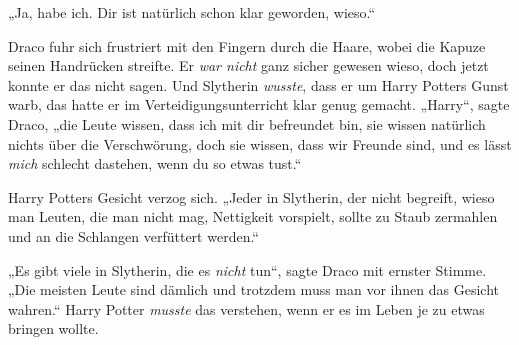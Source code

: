 „Ja, habe ich. Dir ist natürlich schon klar geworden, wieso.“

Draco fuhr sich frustriert mit den Fingern durch die Haare, wobei die Kapuze seinen Handrücken streifte. Er \emph{war nicht} ganz sicher gewesen wieso, doch jetzt konnte er das nicht sagen. Und Slytherin \emph{wusste}, dass er um Harry Potters Gunst warb, das hatte er im Verteidigungsunterricht klar genug gemacht.
„Harry“, sagte Draco, „die Leute wissen, dass ich mit dir befreundet bin, sie wissen natürlich nichts über die Verschwörung, doch sie wissen, dass wir Freunde sind, und es lässt \emph{mich} schlecht dastehen, wenn du so etwas tust.“

Harry Potters Gesicht verzog sich.
„Jeder in Slytherin, der nicht begreift, wieso man Leuten, die man nicht mag, Nettigkeit vorspielt, sollte zu Staub zermahlen und an die Schlangen verfüttert werden.“

„Es gibt viele in Slytherin, die es \emph{nicht} tun“, sagte Draco mit ernster Stimme.
„Die meisten Leute sind dämlich und trotzdem muss man vor ihnen das Gesicht wahren.“ Harry Potter \emph{musste} das verstehen, wenn er es im Leben je zu etwas bringen wollte.

